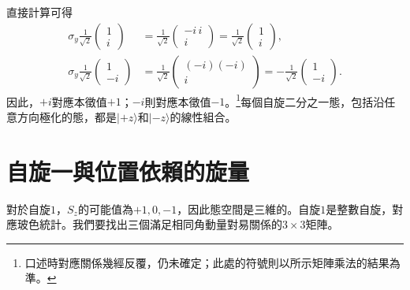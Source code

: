 \begin{classroomqa}
\end{classroomqa}

直接計算可得
\begin{align}
\sigma_y\frac{1}{\sqrt2}
\begin{pmatrix}
1\\
i
\end{pmatrix}
&=
\frac{1}{\sqrt2}
\begin{pmatrix}
-i\,i\\
i
\end{pmatrix}
=
\frac{1}{\sqrt2}
\begin{pmatrix}
1\\
i
\end{pmatrix},\\
\sigma_y\frac{1}{\sqrt2}
\begin{pmatrix}
1\\
-i
\end{pmatrix}
&=
\frac{1}{\sqrt2}
\begin{pmatrix}
(-i)(-i)\\
i
\end{pmatrix}
=
-\frac{1}{\sqrt2}
\begin{pmatrix}
1\\
-i
\end{pmatrix}.
\end{align}
因此，\(+i\)對應本徵值\(+1\)；\(-i\)則對應本徵值\(-1\)。\footnote{口述時對應關係幾經反覆，仍未確定；此處的符號則以所示矩陣乘法的結果為準。}每個自旋二分之一態，包括沿任意方向極化的態，都是\(|+z\rangle\)和\(|-z\rangle\)的線性組合。

\section{自旋一與位置依賴的旋量}

對於自旋\(1\)，\(S_z\)的可能值為\(+1,0,-1\)，因此態空間是三維的。自旋\(1\)是整數自旋，對應玻色統計。我們要找出三個滿足相同角動量對易關係的\(3\times3\)矩陣。

